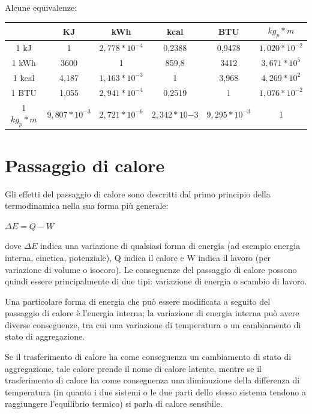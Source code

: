 \documentclass[a4paper]{report}
\begin{document}
    
    Alcune equivalenze:
    \newline
    \begin{table}[htbp]
        \centering
            \begin{tabular}{|c|c|c|c|c|c|}
                \hline
                & KJ & kWh & kcal & BTU & $kg_p*m$ \\\hline
                1 kJ & 1 &	$2,778*10^{-4}$ &	0,2388 &	0,9478 &	$1,020*10^{-2}$\\ \hline
                1 kWh &	3600 &	1 &	859,8 &	3412 &	$3,671*10^5$ \\ \hline
                1 kcal & 4,187 & $1,163*10^{-3}$ &	1 & 3,968 &	$4,269*10^2$ \\ \hline
                1 BTU & 1,055 & $2,941*10^{-4}$ & 0,2519 & 1 & $1,076*10^{-2}$ \\ \hline
                1 $kg_p*m$ & $9,807*10^{-3}$ & $2,721*10^{-6}$ & $2,342*10{-3}$ &	$9,295*10^{-3}$ & 1 \\ \hline
            \end{tabular}
    \end{table}

\section{Passaggio di calore}
    Gli effetti del passaggio di calore sono descritti dal primo principio della termodinamica nella sua forma più generale:
    
    $\Delta E=Q-W$

    dove $\Delta E$ indica una variazione di qualsiasi forma di energia (ad esempio energia interna, cinetica, potenziale), Q indica il calore e W indica il lavoro (per variazione di volume o isocoro). Le conseguenze del passaggio di calore possono quindi essere principalmente di due tipi: variazione di energia o scambio di lavoro.

    Una particolare forma di energia che può essere modificata a seguito del passaggio di calore è l'energia interna; la variazione di energia interna può avere diverse conseguenze, tra cui una variazione di temperatura o un cambiamento di stato di aggregazione.

    Se il trasferimento di calore ha come conseguenza un cambiamento di stato di aggregazione, tale calore prende il nome di calore latente, mentre se il trasferimento di calore ha come conseguenza una diminuzione della differenza di temperatura (in quanto i due sistemi o le due parti dello stesso sistema tendono a raggiungere l'equilibrio termico) si parla di calore sensibile.
\end{document}
